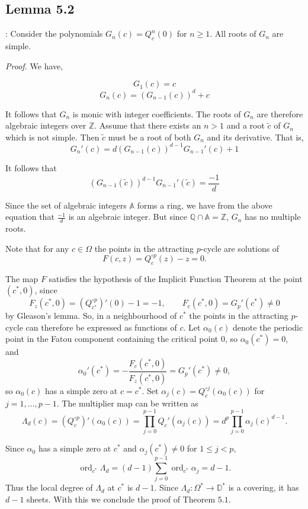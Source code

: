 \documentclass[11pt,a4paper]{article}
\begin{document}
    \subsection*{Lemma 5.2}: Consider the polynomials $G_n(c) = Q^n_c(0)$ for $n\geq 1$. All roots of $G_n$ are simple.


    \textit{Proof.} We have,

    $$G_1(c) = c$$
    $$G_n(c) = (G_{n-1}(c))^d + c$$

    It follows that $G_n$ is monic with integer coefficients. The roots of $G_n$ are therefore algebraic integers over $\mathbb{Z}$. Assume that there exists an $n>1$ and a root $\tilde{c}$ of $G_n$ which is not simple. Then $\tilde{c}$ must be a root of both $G_n$ and its derivative. That is,
    $$G_n'(c) = d(G_{n-1}(c))^{d-1}G_{n-1}'(c)+1$$

    It follows that
    $$(G_{n-1}(\tilde{c}))^{d-1}G_{n-1}'(\tilde{c}) = \frac{-1}{d}$$

    Since the set of algebraic integers $\mathbb{A}$ forms a ring, we have from the above equation that $\frac{-1}{d}$ is an algebraic integer. But since $\mathbb{Q}\cap\mathbb{A} = \mathbb{Z}$, $G_n$ has no multiple roots.


    Note that for any $c\in \Omega$ the points in the attracting $p$-cycle are solutions of
    \[
    F(c,z) = Q_c^{\circ p}(z) - z = 0.
    \]

    The map $F$ satisfies the hypothesis of the Implicit Function Theorem at the point $(c^*,0)$, since
    \[
    F_z(c^*,0)=(Q_{c^*}^{\circ p})'(0)-1=-1,
    \qquad F_c(c^*,0)=G_p'(c^*)\neq0
    \]
    by Gleason's lemma. So, in a neighbourhood of $c^*$ the points in the attracting $p$-cycle can therefore be expressed as functions of $c$. Let $\alpha_0(c)$ denote the periodic point in the Fatou component containing the critical point $0$, so $\alpha_0(c^*)=0$, and
    \[
    \alpha_0'(c^*)=-\frac{F_c(c^*,0)}{F_z(c^*,0)}=G_p'(c^*)\neq0,
    \]
    so $\alpha_0(c)$ has a simple zero at $c=c^*$. Set $\alpha_j(c)=Q_c^{\circ j}(\alpha_0(c))$ for $j=1,\ldots,p-1$. The multiplier map can be written as
    \[
    \Lambda_d(c)=(Q_c^{\circ p})'(\alpha_0(c))
    =\prod_{j=0}^{p-1}Q_c'(\alpha_j(c))
    =d^p\prod_{j=0}^{p-1}\alpha_j(c)^{d-1}.
    \]

    Since $\alpha_0$ has a simple zero at $c^*$ and $\alpha_j(c^*)\neq0$ for $1\leq j<p$,
    \[
    \operatorname{ord}_{c^*}\Lambda_d
    =(d-1)\sum_{j=0}^{p-1}\operatorname{ord}_{c^*}\alpha_j
    =d-1.
    \]
    Thus the local degree of $\Lambda_d$ at $c^*$ is $d-1$. Since $\Lambda_d:\Omega^*\rightarrow\mathbb{D}^*$ is a covering, it has $d-1$ sheets. With this we conclude the proof of Theorem $5.1$.


\end{document}
